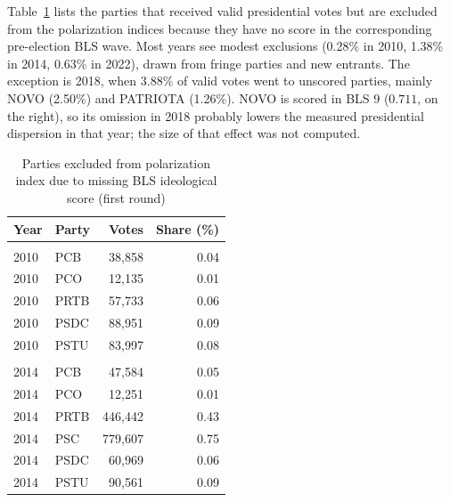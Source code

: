 \documentclass[
	11pt,				%
	oneside,			%
	a4paper,			%
	english,			%
	english				%
	]{abntex2ppgsi}
\theoremstyle{plain}
\theoremstyle{remark}
\theoremstyle{plain}%
\theoremstyle{remark}%
\begin{document}
\begin{apendicesenv}
Table~\ref{tab:parties_no_bls} lists the parties that received valid presidential votes but are excluded from the polarization indices because they have no score in the corresponding pre-election BLS wave. Most years see modest exclusions (0.28\% in 2010, 1.38\% in 2014, 0.63\% in 2022), drawn from fringe parties and new entrants. The exception is 2018, when 3.88\% of valid votes went to unscored parties, mainly NOVO (2.50\%) and PATRIOTA (1.26\%). NOVO is scored in BLS 9 ($0.711$, on the right), so its omission in 2018 probably lowers the measured presidential dispersion in that year; the size of that effect was not computed.

\begin{table}[!h]
\centering
\begin{threeparttable}
\caption{\label{tab:parties_no_bls}Parties excluded from polarization index due to missing BLS ideological score (first round)}
\begin{tabular}{llrr}
\toprule
Year & Party & Votes & Share (\%)\\
\midrule
\addlinespace[0.3em]
\multicolumn{4}{l}{\textbf{2010 — total excluded: 0.28\%}}\\
\hspace{1em}2010 & PCB  & 38,858    & 0.04\\
\hspace{1em}2010 & PCO  & 12,135    & 0.01\\
\hspace{1em}2010 & PRTB & 57,733    & 0.06\\
\hspace{1em}2010 & PSDC & 88,951    & 0.09\\
\hspace{1em}2010 & PSTU & 83,997    & 0.08\\
\addlinespace[0.3em]
\multicolumn{4}{l}{\textbf{2014 — total excluded: 1.38\%}}\\
\hspace{1em}2014 & PCB  & 47,584    & 0.05\\
\hspace{1em}2014 & PCO  & 12,251    & 0.01\\
\hspace{1em}2014 & PRTB & 446,442   & 0.43\\
\hspace{1em}2014 & PSC  & 779,607   & 0.75\\
\hspace{1em}2014 & PSDC & 60,969    & 0.06\\
\hspace{1em}2014 & PSTU & 90,561    & 0.09\\

\end{tabular}
\end{threeparttable}
\end{table}
\end{apendicesenv}
\end{document}
